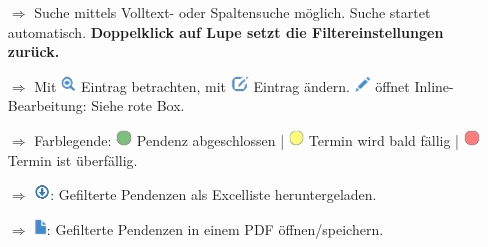\documentclass{article}
\begin{document}

\pagebreak
{}

\vspace{\baselineskip}


\begin{multicols}{2}

\begin{tcolorbox}[colback=blue!5,colframe=blue!40!black,title=Pendenzen in der Übersicht]
\begin{itemize}
  \item[$\Longrightarrow$] Suche mittels Volltext- oder Spaltensuche möglich. Suche startet automatisch. \textbf{Doppelklick auf Lupe setzt die Filtereinstellungen zurück.}
  \item[$\Longrightarrow$] Mit \includegraphics[height=12pt]{Icons/Lupe.png} Eintrag betrachten, mit \includegraphics[height=12pt]{Icons/bearbeiten.png} Eintrag ändern. \includegraphics[height=12pt]{Icons/Stift.png} öffnet Inline-Bearbeitung: Siehe rote Box.
  \item[$\Longrightarrow$] Farblegende: \includegraphics[height=12pt]{Icons/PunktGruen.png} Pendenz abgeschlossen | \includegraphics[height=12pt]{Icons/PunktGelb.png} Termin wird bald fällig | \includegraphics[height=12pt]{Icons/PunktRot.png} Termin ist überfällig.
  \item[$\Longrightarrow$] \includegraphics[height=12pt]{Icons/ListeGenerieren.png}: Gefilterte Pendenzen als Excelliste heruntergeladen.
	\item[$\Longrightarrow$] \includegraphics[height=12pt]{Icons/Blattsymbol.png}: Gefilterte Pendenzen in einem PDF öffnen/speichern.

\end{itemize}
\end{tcolorbox}
\end{multicols}
\end{document}
